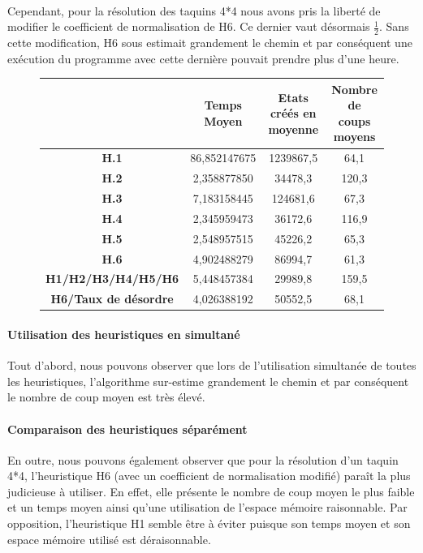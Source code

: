 \documentclass[10pt,a4paper]{report}
\begin{document}
\paragraph{}{Cependant, pour la résolution des taquins 4*4 nous avons pris la liberté de modifier le coefficient de normalisation de H6. Ce dernier vaut désormais $\frac{1}{2}$. Sans cette modification, H6 sous estimait grandement le chemin et par conséquent une exécution du programme avec cette dernière pouvait prendre plus d'une heure.}
{\scriptsize{}
\renewcommand{\arraystretch}{1.3}
\vspace*{1cm}
\begin{figure}[h!]
\centering
\begin{tabular}{| c | c | c | c |} \hline
\textbf{ } & \textbf{Temps Moyen} & \textbf{Etats créés en moyenne} & \textbf{Nombre de coups moyens}\\ \hline
\textbf{H.1} & 86,852147675 & 1239867,5 & 64,1 \\ \hline
\textbf{H.2} & 2,358877850 & 34478,3 & 120,3 \\ \hline
\textbf{H.3} & 7,183158445 & 124681,6 & 67,3 \\ \hline
\textbf{H.4} & 2,345959473 & 36172,6 & 116,9 \\ \hline
\textbf{H.5} & 2,548957515 & 45226,2 & 65,3\\ \hline
\textbf{H.6} & 4,902488279 & 86994,7 & 61,3 \\ \hline
\textbf{H1/H2/H3/H4/H5/H6}&5,448457384&29989,8&159,5\\ \hline
\textbf{H6/Taux de désordre}&4,026388192&50552,5&68,1\\ \hline
\end{tabular}
\end{figure}
}
\newpage
\paragraph{Utilisation des heuristiques en simultané}{Tout d'abord, nous pouvons observer que lors de l'utilisation simultanée de toutes les heuristiques, l'algorithme sur-estime grandement le chemin et par conséquent le nombre de coup moyen est très élevé.}
\paragraph{Comparaison des heuristiques séparément}{En outre, nous pouvons également observer que pour la résolution d'un taquin 4*4, l'heuristique H6 (avec un coefficient de normalisation modifié) paraît la plus judicieuse à utiliser. En effet, elle présente le nombre de coup moyen le plus faible et un temps moyen ainsi qu'une utilisation de l'espace mémoire raisonnable. Par opposition, l'heuristique H1 semble être à éviter puisque son temps moyen et son espace mémoire utilisé est déraisonnable.}
\end{document}
